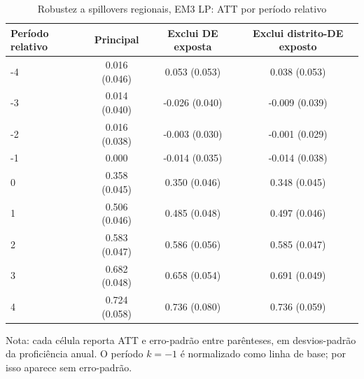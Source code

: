 \begin{table}[!htbp]
\centering
\caption{Robustez a spillovers regionais, EM3 LP: ATT por período relativo}
\label{tab:ap_event_spillover_em3_lp}
\vspace{-0.15cm}
\scriptsize
\setlength{\tabcolsep}{4pt}
\renewcommand{\arraystretch}{0.92}
\begin{tabular}{lccc}
\toprule
Período relativo & Principal & Exclui DE exposta & Exclui distrito-DE exposto \\
\midrule
-4 & 0.016 (0.046) & 0.053 (0.053) & 0.038 (0.053) \\
-3 & 0.014 (0.040) & -0.026 (0.040) & -0.009 (0.039) \\
-2 & 0.016 (0.038) & -0.003 (0.030) & -0.001 (0.029) \\
-1 & 0.000 & -0.014 (0.035) & -0.014 (0.038) \\
0 & 0.358 (0.045) & 0.350 (0.046) & 0.348 (0.045) \\
1 & 0.506 (0.046) & 0.485 (0.048) & 0.497 (0.046) \\
2 & 0.583 (0.047) & 0.586 (0.056) & 0.585 (0.047) \\
3 & 0.682 (0.048) & 0.658 (0.054) & 0.691 (0.049) \\
4 & 0.724 (0.058) & 0.736 (0.080) & 0.736 (0.059) \\
\bottomrule
\end{tabular}
\begin{flushleft}
\footnotesize Nota: cada célula reporta ATT e erro-padrão entre parênteses, em desvios-padrão da proficiência anual. O período \(k=-1\) é normalizado como linha de base; por isso aparece sem erro-padrão.
\end{flushleft}
\end{table}
